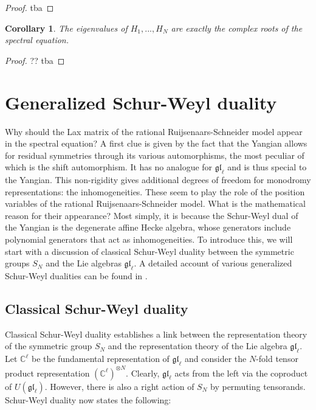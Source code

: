 \documentclass[11pt]{report}
\newtheorem{corollary}[theorem]{Corollary}
\theoremstyle{definition}
\theoremstyle{remark}
\theoremstyle{remark}
\newcommand{\C}{\mathbb{C}}
\begin{document}
\begin{proof}
tba
\end{proof}

\begin{corollary}
The eigenvalues of $H_1,...,H_N$ are exactly the complex roots of the spectral equation.
\end{corollary}

\begin{proof}
?? tba
\end{proof}

\section{Generalized Schur-Weyl duality}

Why should the Lax matrix of the rational Ruijsenaars-Schneider model appear in the spectral equation? A first clue is given by the fact that the Yangian allows for residual symmetries through its various automorphisms, the most peculiar of which is the shift automorphism. It has no analogue for $\mathfrak{gl}_\ell$ and is thus special to the Yangian. This non-rigidity gives additional degrees of freedom for monodromy representations: the inhomogeneities. These seem to play the role of the position variables of the rational Ruijsenaars-Schneider model. What is the mathematical reason for their appearance? Most simply, it is because the Schur-Weyl dual of the Yangian is the degenerate affine Hecke algebra, whose generators include polynomial generators that act as inhomogeneities. To introduce this, we will start with a discussion of classical Schur-Weyl duality between the symmetric groups $S_N$ and the Lie algebras $\mathfrak{gl}_\ell$. A detailed account of various generalized Schur-Weyl dualities can be found in \cite{thesis:antor:2020}.

\subsection{Classical Schur-Weyl duality}

Classical Schur-Weyl duality establishes a link between the representation theory of the symmetric group $S_N$ and the representation theory of the Lie algebra $\mathfrak{gl}_\ell$. Let $\C^\ell$ be the fundamental representation of $\mathfrak{gl}_\ell$ and consider the $N$-fold tensor product representation $(\C^\ell)^{\otimes N}$. Clearly, $\mathfrak{gl}_\ell$ acts from the left via the coproduct of $U(\mathfrak{gl}_\ell)$. However, there is also a right action of $S_N$ by permuting tensorands. Schur-Weyl duality now states the following:
\end{document}
